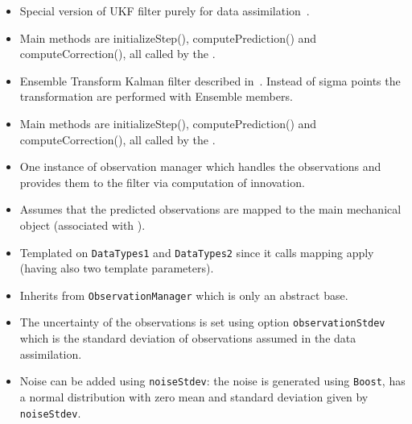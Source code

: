 \documentclass[10pt]{article}
\begin{document}
\medskip
{\large \ukfsc}
\begin{itemize}
\item Special version of UKF filter purely for data assimilation~\cite{EbrahimianExtendedKalmanFilterForMaterialParameterEstimationInNonlinearStructuralFiniteElementModels2015}.
\item Main methods are initializeStep(), computePrediction() and computeCorrection(), all called by the \al.
\end{itemize}
\medskip
{\large \entkf}
\begin{itemize}
\item Ensemble Transform Kalman filter described in~\cite{HuttDivergenceOfTheEnsembleTransformKalmanFilter2020}. Instead of sigma points the transformation are performed with Ensemble members.
\item Main methods are initializeStep(), computePrediction() and computeCorrection(), all called by the \al.
\end{itemize}
\medskip
{\large\mobs}
\begin{itemize}
\item One instance of observation manager which handles the observations and provides them to the filter via computation of innovation.
\item Assumes that the predicted observations are mapped to the main mechanical object (associated with \ssw).
\item Templated on \texttt{DataTypes1} and \texttt{DataTypes2} since it calls mapping apply (having also two template parameters).
\item Inherits from \texttt{ObservationManager} which is only an abstract base.
\item The uncertainty of the observations is set using option \texttt{observationStdev} which is the standard deviation of observations assumed in the data assimilation.
\item Noise can be added using \texttt{noiseStdev}: the noise is generated using \texttt{Boost}, has a normal distribution with zero mean and standard deviation given by \texttt{noiseStdev}.
\end{itemize}
\medskip
{\large\opr}
\end{document}
